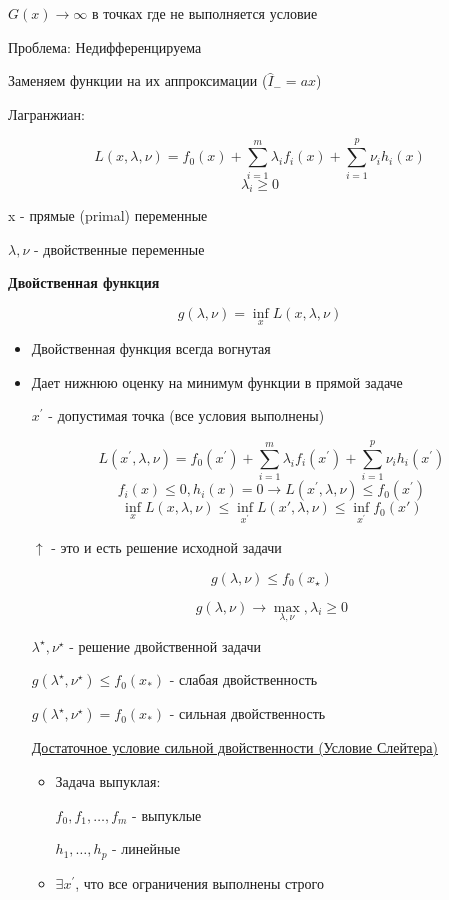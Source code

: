 \documentclass[a4paper, 12pt]{article}
\begin{document}
\(G(x) \rightarrow \infty\) в точках где не выполняется условие

Проблема: Недифференцируема

Заменяем функции на их аппроксимации ($\hat{I}_{-} = ax$)

Лагранжиан:

\[L(x, \lambda, \nu) = f_0(x) + \sum_{i = 1}^m \lambda_i f_i(x) + \sum_{i = 1}^p \nu_i h_i(x)\]
\[\lambda_i \geq 0\]

x - прямые (primal) переменные

$\lambda, \nu$ - двойственные переменные

\textbf{Двойственная функция}

\[g(\lambda, \nu) = \inf_{x} L(x, \lambda, \nu)\]

\begin{itemize}
    \item Двойственная функция всегда вогнутая
    \item Дает нижнюю оценку на минимум функции в прямой задаче
    
    \(x^{\prime}\) - допустимая точка (все условия выполнены)

    \[L(x^{\prime}, \lambda, \nu) = f_0(x^{\prime}) + 
    \sum_{i = 1}^m \lambda_i f_i(x^{\prime}) + \sum_{i = 1}^p \nu_i h_i(x^{\prime})\]
    \[f_i(x) \leq 0, h_i(x) = 0 \rightarrow 
    L(x^{\prime}, \lambda, \nu) \leq f_0(x^{\prime})\]
    \[\inf_x L(x, \lambda, \nu) \leq \inf_{x^{\prime}} 
    L(x', \lambda, \nu) \leq \inf_{x^{\prime}} f_0(x')\]

    $\uparrow$ - это и есть решение исходной задачи

    \[g(\lambda, \nu) \leq f_0(x_{\star})\]

    \[g(\lambda, \nu) \rightarrow \max_{\lambda, \nu}, \lambda_i \geq 0\]

    \(\lambda^{\star}, \nu^{\star}\) - решение двойственной задачи

    \(g(\lambda^{\star}, \nu^{\star}) \leq f_0(x_{*})\) - слабая двойственность

    \(g(\lambda^{\star}, \nu^{\star}) = f_0(x_{*})\) - сильная двойственность

    \underline{Достаточное условие сильной двойственности (Условие Слейтера)}

    \begin{itemize}
        \item Задача выпуклая:
        
        \(f_0, f_1, \ldots, f_m\) - выпуклые

        \(h_1, \ldots, h_p\) - линейные
        \item \(\exists x^{\prime}\), что все ограничения выполнены строго
    \end{itemize}
\end{itemize}
\end{document}
